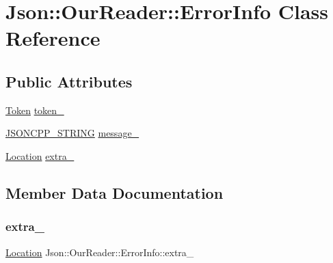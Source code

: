 \hypertarget{classJson_1_1OurReader_1_1ErrorInfo}{}\section{Json\+:\+:Our\+Reader\+:\+:Error\+Info Class Reference}
\label{classJson_1_1OurReader_1_1ErrorInfo}
\subsection*{Public Attributes}
\begin{DoxyCompactItemize}
\item 
\hyperlink{classJson_1_1OurReader_1_1Token}{Token} \hyperlink{classJson_1_1OurReader_1_1ErrorInfo_ad05204ecabe5e7201a842935b874ae9a_ad05204ecabe5e7201a842935b874ae9a}{token\+\_\+}
\item 
\hyperlink{json_8h_a1e723f95759de062585bc4a8fd3fa4be_a1e723f95759de062585bc4a8fd3fa4be}{J\+S\+O\+N\+C\+P\+P\+\_\+\+S\+T\+R\+I\+NG} \hyperlink{classJson_1_1OurReader_1_1ErrorInfo_af14b6bf58ee1cb3388c18ee336ee2394_af14b6bf58ee1cb3388c18ee336ee2394}{message\+\_\+}
\item 
\hyperlink{classJson_1_1OurReader_a1bdc7bbc52ba87cae6b19746f2ee0189_a1bdc7bbc52ba87cae6b19746f2ee0189}{Location} \hyperlink{classJson_1_1OurReader_1_1ErrorInfo_a77ba2d32a471c7b9bc14621b76a5bdab_a77ba2d32a471c7b9bc14621b76a5bdab}{extra\+\_\+}
\end{DoxyCompactItemize}


\subsection{Member Data Documentation}
\mbox{\label{classJson_1_1OurReader_1_1ErrorInfo_a77ba2d32a471c7b9bc14621b76a5bdab_a77ba2d32a471c7b9bc14621b76a5bdab}} 
\subsubsection{\texorpdfstring{extra\+\_\+}{extra\_}}
{\footnotesize\ttfamily \hyperlink{classJson_1_1OurReader_a1bdc7bbc52ba87cae6b19746f2ee0189_a1bdc7bbc52ba87cae6b19746f2ee0189}{Location} Json\+::\+Our\+Reader\+::\+Error\+Info\+::extra\+\_\+}



